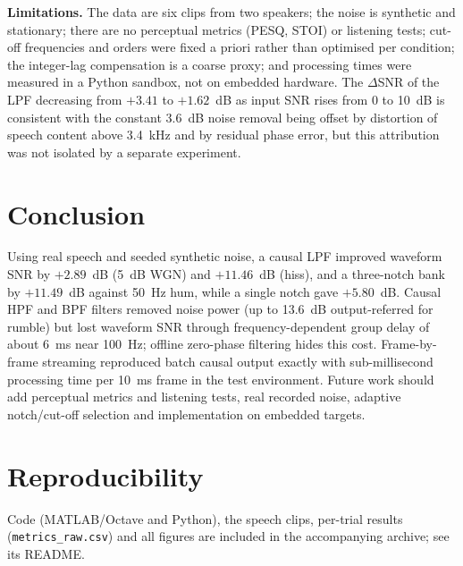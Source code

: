 \documentclass[conference]{IEEEtran}
\begin{document}
\textbf{Limitations.} The data are six clips from two speakers; the noise is synthetic and stationary; there are no perceptual metrics (PESQ, STOI) or listening tests; cut-off frequencies and orders were fixed a priori rather than optimised per condition; the integer-lag compensation is a coarse proxy; and processing times were measured in a Python sandbox, not on embedded hardware. The $\Delta$SNR of the LPF decreasing from $+3.41$ to $+1.62$~dB as input SNR rises from 0 to 10~dB is consistent with the constant 3.6~dB noise removal being offset by distortion of speech content above 3.4~kHz and by residual phase error, but this attribution was not isolated by a separate experiment.

\section{Conclusion}
Using real speech and seeded synthetic noise, a causal LPF improved waveform SNR by $+2.89$~dB (5~dB WGN) and $+11.46$~dB (hiss), and a three-notch bank by $+11.49$~dB against 50~Hz hum, while a single notch gave $+5.80$~dB. Causal HPF and BPF filters removed noise power (up to 13.6~dB output-referred for rumble) but lost waveform SNR through frequency-dependent group delay of about 6~ms near 100~Hz; offline zero-phase filtering hides this cost. Frame-by-frame streaming reproduced batch causal output exactly with sub-millisecond processing time per 10~ms frame in the test environment. Future work should add perceptual metrics and listening tests, real recorded noise, adaptive notch/cut-off selection and implementation on embedded targets.

\section*{Reproducibility}
Code (MATLAB/Octave and Python), the speech clips, per-trial results (\texttt{metrics\_raw.csv}) and all figures are included in the accompanying archive; see its README.



\end{document}
